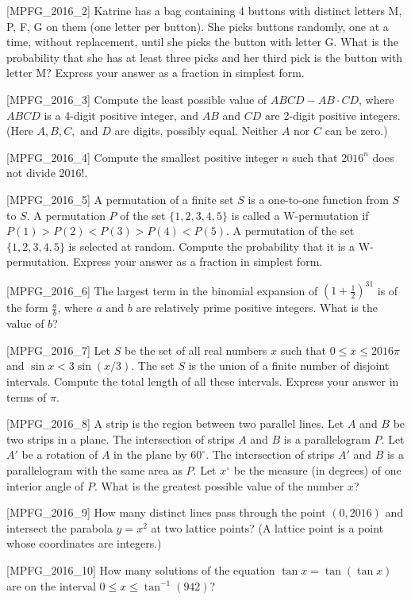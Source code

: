 [MPFG_2016_2]
Katrine has a bag containing 4 buttons with distinct letters M, P, F, G on them (one letter per button). She picks buttons randomly, one at a time, without replacement, until she picks the button with letter G. What is the probability that she has at least three picks and her third pick is the button with letter M? Express your answer as a fraction in simplest form.

[MPFG_2016_3]
Compute the least possible value of $ABCD - AB \cdot CD$, where $ABCD$ is a 4-digit positive integer, and $AB$ and $CD$ are 2-digit positive integers. (Here $A, B, C,$ and $D$ are digits, possibly equal. Neither $A$ nor $C$ can be zero.)

[MPFG_2016_4]
Compute the smallest positive integer $n$ such that $2016^n$ does not divide $2016!$.

[MPFG_2016_5]
A permutation of a finite set $S$ is a one-to-one function from $S$ to $S$. A permutation $P$ of the set $\{1,2,3,4,5\}$ is called a W-permutation if $P(1) > P(2) < P(3) > P(4) < P(5)$. A permutation of the set $\{1,2,3,4,5\}$ is selected at random. Compute the probability that it is a W-permutation. Express your answer as a fraction in simplest form.

[MPFG_2016_6]
The largest term in the binomial expansion of $\left(1+\frac{1}{2}\right)^{31}$ is of the form $\frac{a}{b}$, where $a$ and $b$ are relatively prime positive integers. What is the value of $b$?

[MPFG_2016_7]
Let $S$ be the set of all real numbers $x$ such that $0 \le x \le 2016\pi$ and $\sin x < 3\sin(x/3)$. The set $S$ is the union of a finite number of disjoint intervals. Compute the total length of all these intervals. Express your answer in terms of $\pi$.

[MPFG_2016_8]
A strip is the region between two parallel lines. Let $A$ and $B$ be two strips in a plane. The intersection of strips $A$ and $B$ is a parallelogram $P$. Let $A'$ be a rotation of $A$ in the plane by $60^\circ$. The intersection of strips $A'$ and $B$ is a parallelogram with the same area as $P$. Let $x^\circ$ be the measure (in degrees) of one interior angle of $P$. What is the greatest possible value of the number $x$?

[MPFG_2016_9]
How many distinct lines pass through the point $(0,2016)$ and intersect the parabola $y=x^2$ at two lattice points? (A lattice point is a point whose coordinates are integers.)

[MPFG_2016_10]
How many solutions of the equation $\tan x = \tan(\tan x)$ are on the interval $0 \le x \le \tan^{-1}(942)$?

